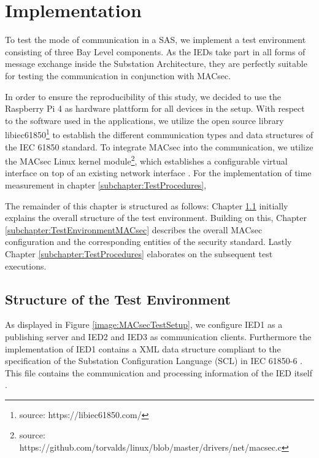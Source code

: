 \documentclass[conference, onecolumn, a4paper]{IEEEtran}
\begin{document}
\section{Implementation}
\label{chapter:implementation}
\noindent To test the mode of communication in a SAS, we implement a test environment consisting of three Bay Level components. As the IEDs take part 
in all forms of message exchange inside the Substation Architecture, they are perfectly suitable for testing the communication in conjunction with MACsec. 

\smallskip
In order to ensure the reproducibility of this study, we decided to use the Raspberry Pi 4 as hardware plattform for all devices in the setup. With respect 
to the software used in the applications, we utilize the open source library libiec61850\footnote{source: https://libiec61850.com/} to establish the 
different communication types and data structures of the IEC 61850 standard. To integrate MACsec into the communication, we utilize the MACsec Linux kernel 
module\footnote{source: https://github.com/torvalds/linux/blob/master/drivers/net/macsec.c}, which establishes a configurable virtual interface on top of 
an existing network interface \cite{MACsecLinuxModuleDoc:2016}. For the implementation of time measurement in chapter \ref{subchapter:TestProcedures},  

\smallskip 
The remainder of this chapter is structured as follows: Chapter \ref{subchapter:TestEnvironmentStructure} initially explains the overall structure of the 
test environment. Building on this, Chapter \ref{subchapter:TestEnvironmentMACsec} describes the overall MACsec configuration and the corresponding entities 
of the security standard. Lastly Chapter \ref{subchapter:TestProcedures} elaborates on the subsequent test executions. 

\subsection{Structure of the Test Environment}
\label{subchapter:TestEnvironmentStructure}
\noindent As displayed in Figure \ref{image:MACsecTestSetup}, we configure IED1 as a publishing server and IED2 and IED3 as communication clients. 
Furthermore the implementation of IED1 contains a XML data structure compliant to the specification of the Substation Configuration Language (SCL) 
in IEC 61850-6 \cite{IEC61850-6:2010}. This file contains the communication and processing information of the IED itself \cite{IEC61850_Overview:2006}.
\end{document}
